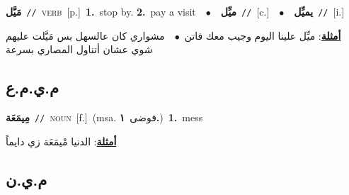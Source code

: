 \documentclass[10pt,a4paper,twoside]{article} %
\begin{document}
\begin{multicols}{2}
{\setlength\topsep{0pt}\textbf{\foreignlanguage{arabic}{مَيَّل}}\ {\color{gray}\texttt{//}\color{black}}\ \textsc{verb}\ [p.]\ \textbf{1.}~stop by.  \textbf{2.}~pay a visit\ \ $\bullet$\ \ \setlength\topsep{0pt}\textbf{\foreignlanguage{arabic}{ميِّل}}\ {\color{gray}\texttt{//}\color{black}}\ [c.]\ \ $\bullet$\ \ \setlength\topsep{0pt}\textbf{\foreignlanguage{arabic}{يميِّل}}\ {\color{gray}\texttt{//}\color{black}}\ [i.]\  \begin{flushright}\color{gray}\foreignlanguage{arabic}{\textbf{\underline{\foreignlanguage{arabic}{أمثلة}}}: ميِّل علينا اليوم وجيب معك فاتن\ $\bullet$\ \  مشواري كان عالسهل بس مَيَّلت عليهم شوي عشان أتناول المصاري بسرعة}\end{flushright}\color{black}} \vspace{2mm}

\vspace{-3mm}
\subsection*{\color{blue}\foreignlanguage{arabic}{م.ي.م.ع}\color{blue}{}} 

{\setlength\topsep{0pt}\textbf{\foreignlanguage{arabic}{مِيمَعَة}}\ {\color{gray}\texttt{//}\color{black}}\ \textsc{noun}\ [f.]\ \color{gray}(msa. \foreignlanguage{arabic}{فوضى}~\foreignlanguage{arabic}{\textbf{١.}})\color{black}\ \textbf{1.}~mess\  \begin{flushright}\color{gray}\foreignlanguage{arabic}{\textbf{\underline{\foreignlanguage{arabic}{أمثلة}}}: الدنيا مْيمَعَة زي دايماً}\end{flushright}\color{black}} \vspace{2mm}

\vspace{-3mm}
\subsection*{\color{blue}\foreignlanguage{arabic}{م.ي.ن}\color{blue}{}} 


\end{multicols}
\end{document}
